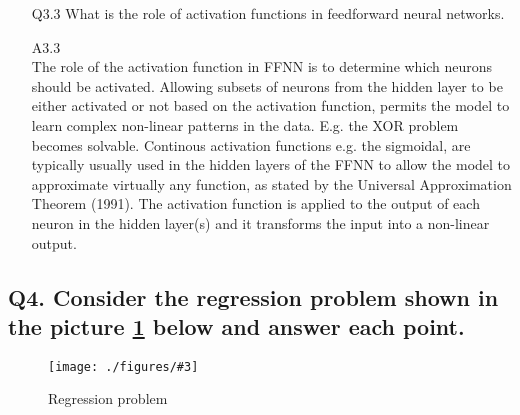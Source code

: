 \documentclass[unicode, 11pt, a4paper]{scrartcl}
\newcommand{\myFigure}[3]{
    \begin{figure}[htbp]
    \centering
    \caption{#1}
    \label{#2}
    \texttt{[image: ./figures/\#3]}
    \end{figure}
}
\begin{document}
\begin{itemize}
	\item[Q3.3] What is the role of activation functions in feedforward neural networks.

	\item[A3.3] ~\\
		  The role of the activation function in FFNN is to determine which neurons should be activated.
		  Allowing subsets of neurons from the hidden layer to be either activated or not based on the 
		  activation function, permits the model to learn complex non-linear patterns in the data. 
		  E.g. the XOR problem becomes solvable.
		  Continous activation functions e.g. the sigmoidal, 
		  are typically usually used in the hidden layers of the FFNN to allow
		  the model to approximate virtually any function, 
		  as stated by the Universal Approximation Theorem (1991).
		The activation function is applied to the output of each neuron in the hidden layer(s)
		and it transforms the input into a non-linear output.
\end{itemize}

\subsection*{
	Q4. Consider the regression problem shown in the picture \ref{fig:ex-q4-regression}
	below and answer each point.
}

\myFigure{Regression problem}{fig:ex-q4-regression}{parabolic.jpg}
\end{document}
